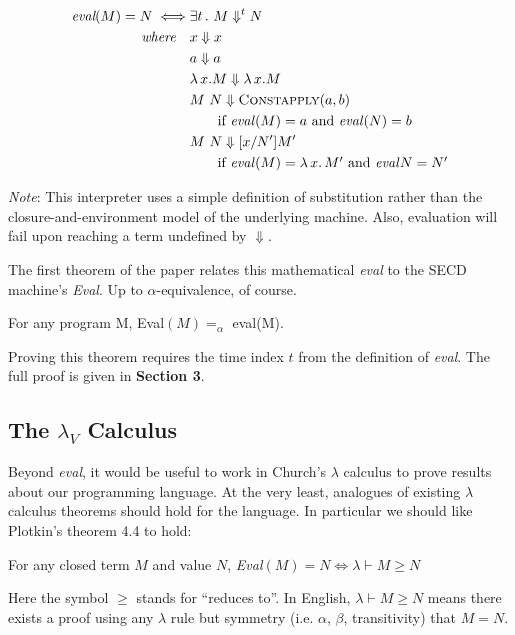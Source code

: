 \documentclass{article}
\begin{document}
\begin{align*}
  \emph{eval}(M) = N \iff& \exists t\,.~M \Downarrow^t N
\\\emph{where}\quad & x \Downarrow x
\\                  & a \Downarrow a
\\                  & \lambda\,x.M \Downarrow \lambda\,x.M
\\                  & M~N \Downarrow \textsc{Constapply}(a,b)
\\                  & \qquad \mbox{if \emph{eval}$(M) = a$ and \emph{eval}$(N) = b$}
\\                  & M~N \Downarrow [x/N']M'
\\                  & \qquad \mbox{if \emph{eval}$(M) = \lambda\,x.\,M'$ and \emph{eval}$N = N'$}
\end{align*}

\emph{Note}: This interpreter uses a simple definition of substitution rather than the closure-and-environment model of the underlying machine.
Also, evaluation will fail upon reaching a term undefined by $\Downarrow$.

The first theorem of the paper relates this mathematical \emph{eval} to the SECD machine's \emph{Eval}.
Up to $\alpha$-equivalence, of course.

\begin{theorem}
For any program M, Eval$(M) =_\alpha$ eval(M).
\end{theorem}

Proving this theorem requires the time index $t$ from the definition of \emph{eval}.
The full proof is given in {\bf Section 3}.


\subsection{The $\lambda_V$ Calculus}

Beyond \emph{eval}, it would be useful to work in Church's $\lambda$ calculus to prove results about our programming language.
At the very least, analogues of existing $\lambda$ calculus theorems should hold for the language.
In particular we should like Plotkin's theorem 4.4 to hold:

\begin{theorem}
For any closed term $M$ and value $N$, \emph{Eval}$(M) = N \iff \lambda \vdash M \ge N$
\end{theorem}

Here the symbol $\ge$ stands for ``reduces to''.
In English, $\lambda \vdash M \ge N$ means there exists a proof using any $\lambda$ rule but symmetry (i.e. $\alpha$, $\beta$, transitivity) that $M = N$.
\end{document}
